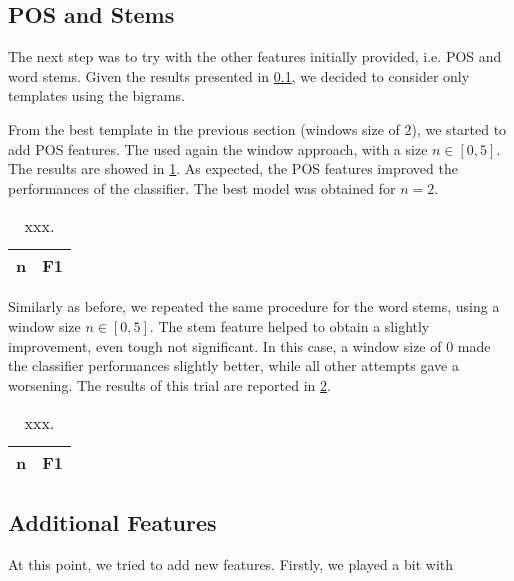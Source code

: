 \subsection{POS and Stems}
\label{subsection:original}
The next step was to try with the other features initially provided, i.e. \ac{POS} and word stems.
Given the results presented in \cref{subsection:original}, we decided to consider only templates using the bigrams.

From the best template in the previous section (windows size of $2$), we started to add \ac{POS} features.
The used again the window approach, with a size $n \in [0,5]$.
The results are showed in \cref{tab:pos}.
As expected, the \ac{POS} features improved the performances of the classifier.
The best model was obtained for $n = 2$.

\begin{table}[t!]
	\centering
    \begin{tabular}{ c c }
    	\toprule
    		\multicolumn{1}{c}{n} & \multicolumn{1}{c}{F1} \\
    	\midrule
            
    	\bottomrule
	\end{tabular}
    \caption{xxx.}
	\label{tab:pos}
\end{table}

Similarly as before, we repeated the same procedure for the word stems, using a window size $n \in [0,5]$.
The stem feature helped to obtain a slightly improvement, even tough not significant.
In this case, a window size of $0$ made the classifier performances slightly better, while all other attempts gave a worsening.
The results of this trial are reported in \cref{tab:stems}.

\begin{table}[t!]
	\centering
    \begin{tabular}{ c c }
    	\toprule
    		\multicolumn{1}{c}{n} & \multicolumn{1}{c}{F1} \\
    	\midrule
            
    	\bottomrule
	\end{tabular}
    \caption{xxx.}
	\label{tab:stems}
\end{table}

\subsection{Additional Features}
\label{subsection:additional}
At this point, we tried to add new features.
Firstly, we played a bit with 

